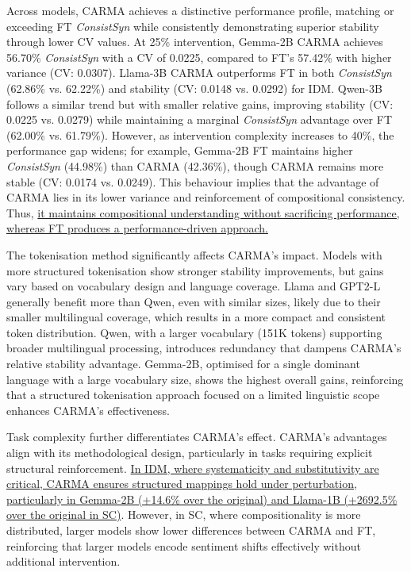 Across models, CARMA achieves a distinctive performance profile, matching or exceeding FT \textit{ConsistSyn} while consistently demonstrating superior stability through lower CV values. At 25\% intervention, Gemma-2B CARMA achieves 56.70\% \textit{ConsistSyn} with a CV of 0.0225, compared to FT's 57.42\% with higher variance (CV: 0.0307). Llama-3B CARMA outperforms FT in both \textit{ConsistSyn} (62.86\% vs. 62.22\%) and stability (CV: 0.0148 vs. 0.0292) for IDM. Qwen-3B follows a similar trend but with smaller relative gains, improving stability (CV: 0.0225 vs. 0.0279) while maintaining a marginal \textit{ConsistSyn} advantage over FT (62.00\% vs. 61.79\%). However, as intervention complexity increases to 40\%, the performance gap widens; for example, Gemma-2B FT maintains higher \textit{ConsistSyn} (44.98\%) than CARMA (42.36\%), though CARMA remains more stable (CV: 0.0174 vs. 0.0249). This behaviour implies that the advantage of CARMA lies in its lower variance and reinforcement of compositional consistency. Thus, \ul{it maintains compositional understanding without sacrificing performance, whereas FT produces a performance-driven approach.}


The tokenisation method significantly affects CARMA's impact. Models with more structured tokenisation show stronger stability improvements, but gains vary based on vocabulary design and language coverage. Llama and GPT2-L generally benefit more than Qwen, even with similar sizes, likely due to their smaller multilingual coverage, which results in a more compact and consistent token distribution. Qwen, with a larger vocabulary (151K tokens) supporting broader multilingual processing, introduces redundancy that dampens CARMA's relative stability advantage. Gemma-2B, optimised for a single dominant language with a large vocabulary size, shows the highest overall gains, reinforcing that a structured tokenisation approach focused on a limited linguistic scope enhances CARMA's effectiveness.

Task complexity further differentiates CARMA's effect. CARMA's advantages align with its methodological design, particularly in tasks requiring explicit structural reinforcement. \ul{In IDM, where systematicity and substitutivity are critical, CARMA ensures structured mappings hold under perturbation, particularly in Gemma-2B (+14.6\% over the original) and Llama-1B (+2692.5\% over the original in SC)}. However, in SC, where compositionality is more distributed, larger models show lower differences between CARMA and FT, reinforcing that larger models encode sentiment shifts effectively without additional intervention.

